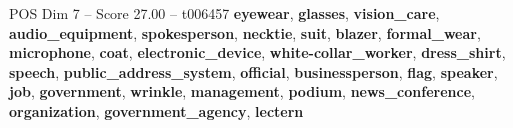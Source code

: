 \begin{textsample}{POS Dim 7 – Score 27.00 – t006457}  \label{ex:f7_pos_034}
\textbf{eyewear}, \textbf{glasses}, \textbf{vision\_care}, \textbf{audio\_equipment}, \textbf{spokesperson}, \textbf{necktie}, \textbf{suit}, \textbf{blazer}, \textbf{formal\_wear}, \textbf{microphone}, \textbf{coat}, \textbf{electronic\_device}, \textbf{white-collar\_worker}, \textbf{dress\_shirt}, \textbf{speech}, \textbf{public\_address\_system}, \textbf{official}, \textbf{businessperson}, \textbf{flag}, \textbf{speaker}, \textbf{job}, \textbf{government}, \textbf{wrinkle}, \textbf{management}, \textbf{podium}, \textbf{news\_conference}, \textbf{organization}, \textbf{government\_agency}, \textbf{lectern}

\end{textsample}
